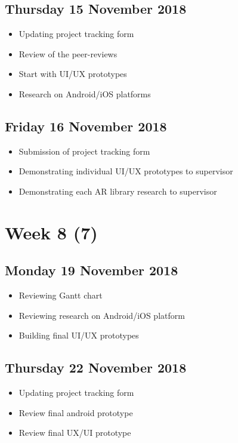 \subsection*{Thursday 15 November 2018}
\begin{itemize}
    \item Updating project tracking form
	\item Review of the peer-reviews
	\item Start with UI/UX prototypes
	\item Research on Android/iOS platforms
\end{itemize}

\subsection*{Friday 16 November 2018}
\begin{itemize}
    \item Submission of project tracking form
	\item Demonstrating individual UI/UX prototypes to supervisor
	\item Demonstrating each AR library research to supervisor
\end{itemize}

\section*{Week 8 (7)}
\subsection*{Monday 19 November 2018}
\begin{itemize}
	\item Reviewing Gantt chart
	\item Reviewing research on Android/iOS platform
	\item Building final UI/UX prototypes
\end{itemize}

\subsection*{Thursday 22 November 2018}
\begin{itemize}
    \item Updating project tracking form
	\item Review final android prototype
	\item Review final UX/UI prototype
\end{itemize}


